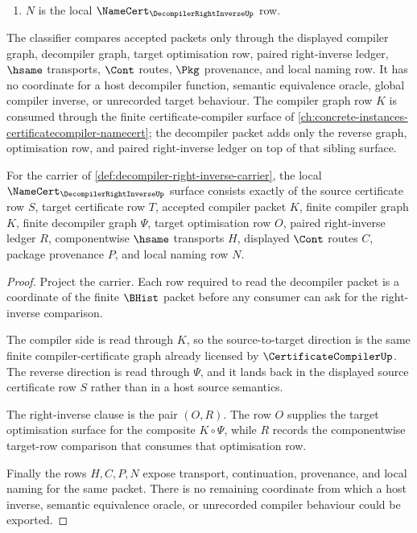 \begin{definition}
\begin{enumerate}
\item $N$ is the local $\NameCert_{\DecompilerRightInverseUp}$ row.
\end{enumerate}
The classifier compares accepted packets only through the displayed compiler
graph, decompiler graph, target optimisation row, paired right-inverse ledger,
$\hsame$ transports, $\Cont$ routes, $\Pkg$ provenance, and local naming row.
It has no coordinate for a host decompiler function, semantic equivalence
oracle, global compiler inverse, or unrecorded target behaviour.
The compiler graph row $K$ is consumed through the finite
certificate-compiler surface of
\autoref{ch:concrete-instances-certificatecompiler-namecert}; the decompiler
packet adds only the reverse graph, optimisation row, and paired right-inverse
ledger on top of that sibling surface.
\end{definition}

\begin{theorem}
\label{thm:decompiler-right-inverse-namecert-obligations}
For the carrier of \autoref{def:decompiler-right-inverse-carrier}, the local
$\NameCert_{\DecompilerRightInverseUp}$ surface consists exactly of the source
certificate row $S$, target certificate row $T$, accepted compiler packet $K$,
finite compiler graph $K$, finite decompiler graph $\Psi$, target optimisation row $O$, paired
right-inverse ledger $R$, componentwise $\hsame$ transports $H$, displayed
$\Cont$ routes $C$, package provenance $P$, and local naming row $N$.
\end{theorem}
\begin{proof}
Project the carrier. Each row required to read the decompiler packet is a
coordinate of the finite $\BHist$ packet before any consumer can ask for the
right-inverse comparison.

The compiler side is read through $K$, so the source-to-target direction is the
same finite compiler-certificate graph already licensed by
$\CertificateCompilerUp$. The reverse direction is read through $\Psi$, and it
lands back in the displayed source certificate row $S$ rather than in a host
source semantics.

The right-inverse clause is the pair $(O,R)$. The row $O$ supplies the target
optimisation surface for the composite $K\circ\Psi$, while $R$ records the
componentwise target-row comparison that consumes that optimisation row.

Finally the rows $H,C,P,N$ expose transport, continuation, provenance, and local
naming for the same packet. There is no remaining coordinate from which a host
inverse, semantic equivalence oracle, or unrecorded compiler behaviour could be
exported.
\end{proof}

